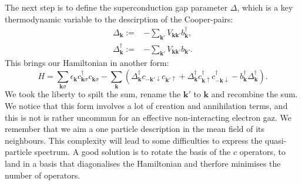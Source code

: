 \documentclass[../main.tex]{subfile}
\begin{document}
The next step is to define the superconduction gap parameter $\Delta$, which is a key thermodynamic variable to the descirption of the Cooper-pairs:
\begin{align}
    \Delta_{\bm{k}} := &-\sum_{\bm{k}'} V_{\bm{k}\bm{k}'} b_{\bm{k}}^{\dagger},\\
    \Delta^{\dagger}_{\bm{k}} := &-\sum_{\bm{k}'} V_{\bm{k}\bm{k}'} b_{\bm{k}'}.\label{eq:DeltaBaseDef}
\end{align}
This brings our Hamiltonian in another form:
\begin{equation} \label{eq:HamiltonianBCS1}
    H = \sum_{\bm{k}\sigma} \epsilon_{\bm{k}} c_{\bm{k}\sigma}^{\dagger}c_{\bm{k}\sigma} - \sum_{\bm{k}} \left( \Delta_{\bm{k}}^{\dagger} c_{-\bm{k}'\downarrow}c_{\bm{k}'\uparrow}  + \Delta_{\bm{k}}^{\dagger} c_{\bm{k}\uparrow} ^{\dagger}c_{-\bm{k}\downarrow}^{\dagger} -  b_{\bm{k}}^{\dagger} \Delta_{\bm{k}}^{\dagger} \right).
\end{equation}
We took the liberty to spilt the sum, rename the $\bm{k}'$ to $\bm{k}$ and recombine the sum. We notice that this form involves a lot of creation and annihilation terms, and this is not 
is rather uncommun for an effective non-interacting electron gaz. We remember that we aim a one particle description in the mean field of its neighbours.
This complexity will lead to some difficulties to express the quasi-particle spectrum. A good solution is 
to rotate the basis of the $c$ operators, to land in a basis that diagonalises the Hamiltonian and therfore minimises the number of operators.\\
\end{document}
